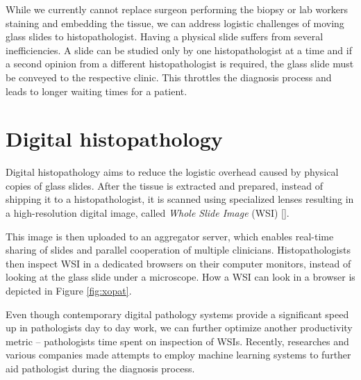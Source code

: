 While we currently cannot replace surgeon performing the biopsy or lab workers staining and embedding the tissue, we can address logistic challenges of moving glass slides to histopathologist. Having a physical slide suffers from several inefficiencies. A slide can be studied only by one histopathologist at a time and if a second opinion from a different histopathologist is required, the glass slide must be conveyed to the respective clinic. This throttles the diagnosis process and leads to longer waiting times for a patient.

\section{Digital histopathology}

Digital histopathology aims to reduce the logistic overhead caused by physical copies of glass slides. After the tissue is extracted and prepared, instead of shipping it to a histopathologist, it is scanned using specialized lenses resulting in a high-resolution digital image, called \emph{Whole Slide Image} (WSI) [].

This image is then uploaded to an aggregator server, which enables real-time sharing of slides and parallel cooperation of multiple clinicians. Histopathologists then inspect WSI in a dedicated browsers on their computer monitors, instead of looking at the glass slide under a microscope. How a WSI can look in a browser is depicted in Figure \ref{fig:xopat}.

Even though contemporary digital pathology systems provide a significant speed up in pathologists day to day work, we can further optimize another productivity metric – pathologists time spent on inspection of WSIs. Recently, researches and various companies made attempts to employ machine learning systems to further aid pathologist during the diagnosis process. 


